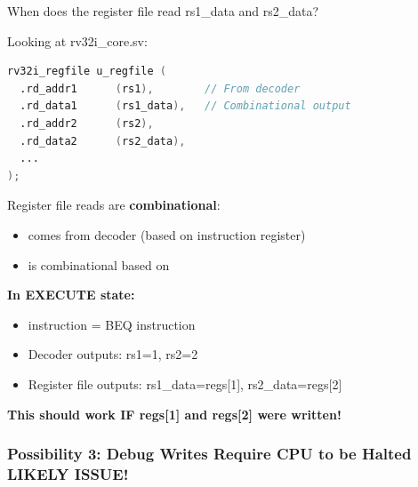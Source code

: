 \begin{record}

When does the register file read rs1\_data and rs2\_data?

Looking at rv32i\_\allowbreak{}core.sv:

\begin{lstlisting}[language=Verilog]
rv32i_regfile u_regfile (
  .rd_addr1      (rs1),        // From decoder
  .rd_data1      (rs1_data),   // Combinational output
  .rd_addr2      (rs2),
  .rd_data2      (rs2_data),
  ...
);
\end{lstlisting}

Register file reads are \textbf{combinational}:

\begin{itemize}
\tightlist
\item
   comes from decoder (based on instruction register)
\item
   is combinational based on 
\end{itemize}

\textbf{In EXECUTE state:}

\begin{itemize}
\tightlist
\item
  instruction = BEQ instruction
\item
  Decoder outputs: rs1=1, rs2=2
\item
  Register file outputs: rs1\_\allowbreak{}data=regs{[}1{]},
  rs2\_\allowbreak{}data=regs{[}2{]}
\end{itemize}

\textbf{This should work IF regs{[}1{]} and regs{[}2{]} were written!}

\end{record}

\subsubsection{\texorpdfstring{Possibility 3: Debug Writes Require CPU
to be Halted \warn{} \textbf{LIKELY
ISSUE!}}{Possibility 3: Debug Writes Require CPU to be Halted  LIKELY ISSUE!}}\label{cr:fix:timing-analysis:possibility-3-debug-writes-require-cpu-to-be-halted-warning-likely-issue}

